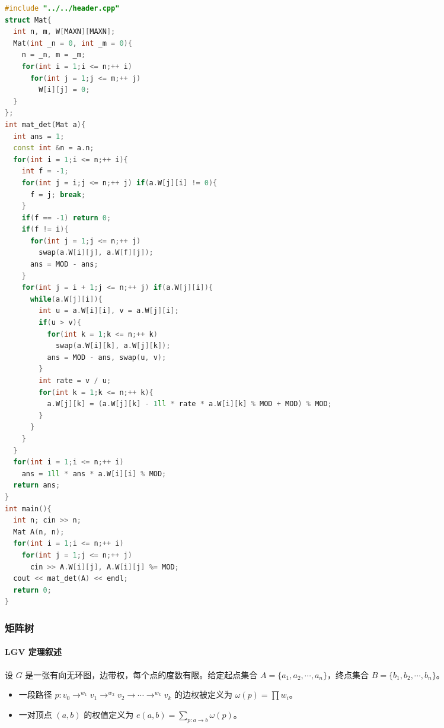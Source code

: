 \documentclass[10pt]{ctexart}
\providecommand{\tightlist}{\setlength{\itemsep}{0pt}\setlength{\parskip}{0pt}}
\begin{document}
\begin{multicols}{3}
\begin{lstlisting}[language={C++}]
#include "../../header.cpp"
struct Mat{
  int n, m, W[MAXN][MAXN];
  Mat(int _n = 0, int _m = 0){
    n = _n, m = _m;
    for(int i = 1;i <= n;++ i)
      for(int j = 1;j <= m;++ j)
        W[i][j] = 0;
  }
};
int mat_det(Mat a){
  int ans = 1;
  const int &n = a.n;
  for(int i = 1;i <= n;++ i){
    int f = -1;
    for(int j = i;j <= n;++ j) if(a.W[j][i] != 0){
      f = j; break;
    }
    if(f == -1) return 0;
    if(f != i){
      for(int j = 1;j <= n;++ j)
        swap(a.W[i][j], a.W[f][j]);
      ans = MOD - ans;
    }
    for(int j = i + 1;j <= n;++ j) if(a.W[j][i]){
      while(a.W[j][i]){
        int u = a.W[i][i], v = a.W[j][i];
        if(u > v){
          for(int k = 1;k <= n;++ k)
            swap(a.W[i][k], a.W[j][k]);
          ans = MOD - ans, swap(u, v);
        }
        int rate = v / u;
        for(int k = 1;k <= n;++ k){
          a.W[j][k] = (a.W[j][k] - 1ll * rate * a.W[i][k] % MOD + MOD) % MOD;
        }
      }
    }
  }
  for(int i = 1;i <= n;++ i)
    ans = 1ll * ans * a.W[i][i] % MOD;
  return ans;
}
int main(){
  int n; cin >> n;
  Mat A(n, n);
  for(int i = 1;i <= n;++ i)
    for(int j = 1;j <= n;++ j)
      cin >> A.W[i][j], A.W[i][j] %= MOD;
  cout << mat_det(A) << endl;
  return 0;
}
\end{lstlisting}

    \subsubsection{矩阵树}\label{ux77e9ux9635ux6811}

    \paragraph{LGV 定理叙述}\label{lgv-ux5b9aux7406ux53d9ux8ff0}

    设 \(G\) 是一张有向无环图，边带权，每个点的度数有限。给定起点集合
    \(A=\{a_1,a_2, \cdots,a_n\}\)，终点集合
    \(B = \{b_1, b_2, \cdots,b_n\}\)。

    \begin{itemize}
    \tightlist
    \item
      一段路径
      \(p:v_0\to^{w_1} v_1\to^{w_2} v_2\to \cdots \to^{w_k} v_k\)
      的边权被定义为 \(\omega (p) = \prod w_i\)。
    \item
      一对顶点 \((a, b)\) 的权值定义为
      \(e(a, b) = \sum_{p:a\to b}\omega (p)\)。
    \end{itemize}


\end{multicols}
\end{document}
